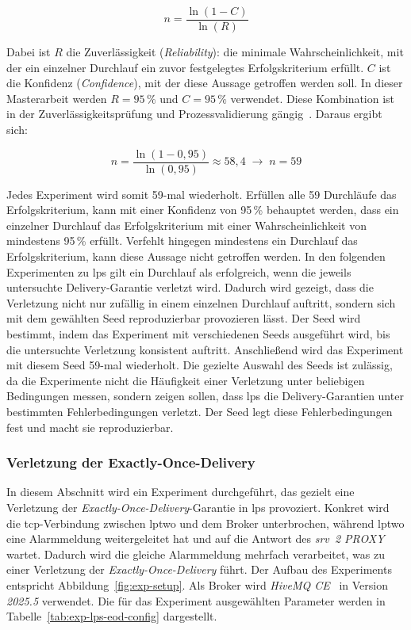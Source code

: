 \begin{equation}
	n = \frac{\ln(1 - C)}{\ln(R)}
	\label{eq:success-run}
\end{equation}

Dabei ist $R$ die Zuverlässigkeit (\textit{Reliability}): die minimale Wahrscheinlichkeit, mit der ein einzelner Durchlauf ein zuvor festgelegtes Erfolgskriterium erfüllt. $C$ ist die Konfidenz (\textit{Confidence}), mit der diese Aussage getroffen werden soll. In dieser Masterarbeit werden $R = 95\,\%$ und $C = 95\,\%$ verwendet. Diese Kombination ist in der Zuverlässigkeitsprüfung und Prozessvalidierung gängig~\citep{qualitymag, schenkelberg2024}. Daraus ergibt sich:

\begin{equation}
	n = \frac{\ln(1 - 0{,}95)}{\ln(0{,}95)} \approx 58{,}4 \;\rightarrow\; n = 59
	\label{eq:success-run-n}
\end{equation}

Jedes Experiment wird somit 59-mal wiederholt. Erfüllen alle 59 Durchläufe das Erfolgskriterium, kann mit einer Konfidenz von 95\,\% behauptet werden, dass ein einzelner Durchlauf das Erfolgskriterium mit einer Wahrscheinlichkeit von mindestens 95\,\% erfüllt. Verfehlt hingegen mindestens ein Durchlauf das Erfolgskriterium, kann diese Aussage nicht getroffen werden. In den folgenden Experimenten zu \gls{lps} gilt ein Durchlauf als erfolgreich, wenn die jeweils untersuchte Delivery-Garantie verletzt wird. Dadurch wird gezeigt, dass die Verletzung nicht nur zufällig in einem einzelnen Durchlauf auftritt, sondern sich mit dem gewählten Seed reproduzierbar provozieren lässt. Der Seed wird bestimmt, indem das Experiment mit verschiedenen Seeds ausgeführt wird, bis die untersuchte Verletzung konsistent auftritt. Anschließend wird das Experiment mit diesem Seed 59-mal wiederholt. Die gezielte Auswahl des Seeds ist zulässig, da die Experimente nicht die Häufigkeit einer Verletzung unter beliebigen Bedingungen messen, sondern zeigen sollen, dass \gls{lps} die Delivery-Garantien unter bestimmten Fehlerbedingungen verletzt. Der Seed legt diese Fehlerbedingungen fest und macht sie reproduzierbar.

\subsubsection{Verletzung der Exactly-Once-Delivery}
\label{sub-sub:lps-verletzung-eod}

In diesem Abschnitt wird ein Experiment durchgeführt, das gezielt eine Verletzung der \textit{Exactly-Once-Delivery}-Garantie in \gls{lps} provoziert. Konkret wird die \gls{tcp}-Verbindung zwischen \gls{lptwo} und dem Broker unterbrochen, während \gls{lptwo} eine Alarmmeldung weitergeleitet hat und auf die Antwort des \textit{\gls{srv}~2 PROXY} wartet. Dadurch wird die gleiche Alarmmeldung mehrfach verarbeitet, was zu einer Verletzung der \textit{Exactly-Once-Delivery} führt. Der Aufbau des Experiments entspricht Abbildung~\ref{fig:exp-setup}. Als Broker wird \textit{HiveMQ CE}~\citep{hivemq_mqtt5_essentials} in Version \textit{2025.5} verwendet. Die für das Experiment ausgewählten Parameter werden in Tabelle~\ref{tab:exp-lps-eod-config} dargestellt.

